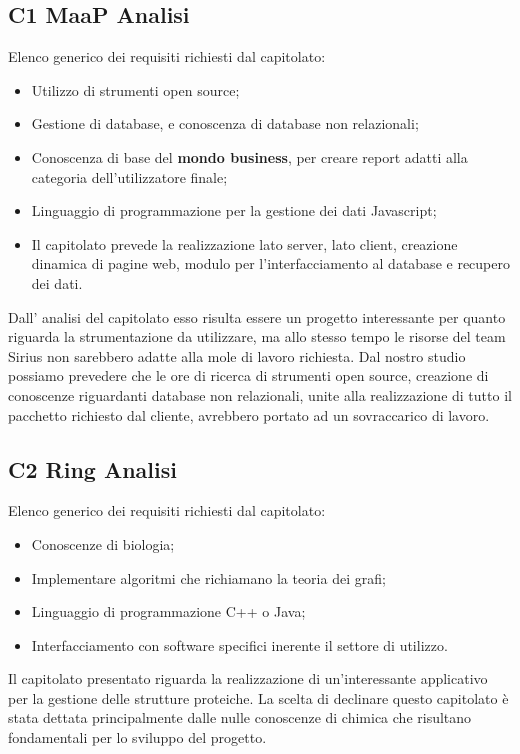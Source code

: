 \subsection{C1 MaaP Analisi}
Elenco generico dei requisiti richiesti dal capitolato:
\begin{itemize} 
\item Utilizzo di strumenti open source;
\item Gestione di database, e conoscenza di database non relazionali;
\item Conoscenza di base del \textbf{mondo business}, per creare report adatti alla categoria dell'utilizzatore finale;
\item Linguaggio di programmazione per la gestione dei dati Javascript;
\item Il capitolato prevede la realizzazione lato server, lato client, creazione dinamica di pagine web, modulo per l'interfacciamento al database e recupero dei dati.
\end{itemize}
Dall' analisi del capitolato esso risulta essere un progetto interessante per quanto riguarda la strumentazione da utilizzare, ma allo stesso tempo le risorse del team Sirius non sarebbero adatte alla mole di lavoro richiesta. Dal nostro studio possiamo prevedere che le ore di ricerca di strumenti open source, creazione di conoscenze riguardanti database non relazionali, unite alla realizzazione di tutto il pacchetto richiesto dal cliente, avrebbero portato ad un sovraccarico di lavoro.
\\
\subsection{C2 Ring Analisi}
Elenco generico dei requisiti richiesti dal capitolato:
\begin{itemize} 
\item Conoscenze di biologia;
\item Implementare algoritmi che richiamano la teoria dei grafi;
\item Linguaggio di programmazione C++ o Java;
\item Interfacciamento con software specifici inerente il settore di utilizzo.
\end{itemize}
Il capitolato presentato riguarda la realizzazione di un'interessante applicativo per la gestione delle strutture proteiche. La scelta di declinare questo capitolato è stata dettata principalmente dalle nulle conoscenze di chimica che risultano fondamentali per lo sviluppo del progetto.\\
